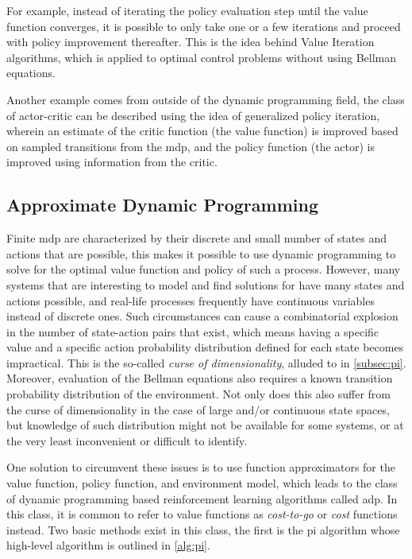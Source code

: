 \documentclass[../report.tex]{subfiles}
\begin{document}
For example, instead of iterating the policy evaluation step until the value function converges, it is possible to only take one or a few iterations and proceed with policy improvement thereafter. This is the idea behind Value Iteration algorithms, which is applied to optimal control problems without using Bellman equations\cite{vi_for_optimal_control, vi_for_optimal_control_2}.

Another example comes from outside of the dynamic programming field, the class of actor-critic can be described using the idea of generalized policy iteration, wherein an estimate of the critic function (the value function) is improved based on sampled transitions from the \ac{mdp}, and the policy function (the actor) is improved using information from the critic.

\subsection{Approximate Dynamic Programming}\label{subsec:adp}
Finite \ac{mdp} are characterized by their discrete and small number of states and actions that are possible, this makes it possible to use dynamic programming to solve for the optimal value function and policy of such a process. However, many systems that are interesting to model and find solutions for have many states and actions possible, and real-life processes frequently have continuous variables instead of discrete ones. Such circumstances can cause a combinatorial explosion in the number of state-action pairs that exist, which means having a specific value and a specific action probability distribution defined for each state becomes impractical. This is the so-called \textit{curse of dimensionality}, alluded to in \autoref{subsec:pi}. Moreover, evaluation of the Bellman equations also requires a known transition probability distribution of the environment. Not only does this also suffer from the curse of dimensionality in the case of large and/or continuous state spaces, but knowledge of such distribution might not be available for some systems, or at the very least inconvenient or difficult to identify. 

One solution to circumvent these issues is to use function approximators for the value function, policy function, and environment model, which leads to the class of dynamic programming based reinforcement learning algorithms called \ac{adp}. In this class, it is common to refer to value functions as \textit{cost-to-go} or \textit{cost} functions instead. Two basic methods exist in this class, the first is the \ac{pi} algorithm whose high-level algorithm is outlined in \autoref{alg:pi}.
\end{document}
